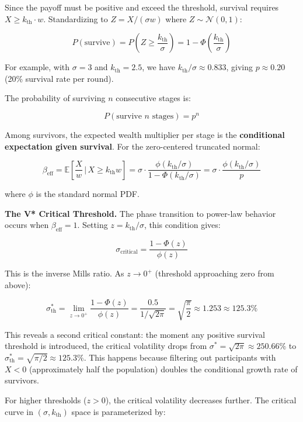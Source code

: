 \documentclass[
  11pt,
  openany]{article}
\begin{document}
Since the payoff must be positive and exceed the threshold, survival
requires \(X \geq k_{\text{th}} \cdot w\). Standardizing to
\(Z = X/(\sigma w)\) where \(Z \sim \mathcal{N}(0, 1)\):

\[P(\text{survive}) = P\left(Z \geq \frac{k_{\text{th}}}{\sigma}\right) = 1 - \Phi\left(\frac{k_{\text{th}}}{\sigma}\right)\]

For example, with \(\sigma = 3\) and \(k_{\text{th}} = 2.5\), we have
\(k_{\text{th}}/\sigma \approx 0.833\), giving \(p \approx 0.20\) (20\%
survival rate per round).

The probability of surviving \(n\) consecutive stages is:

\[P(\text{survive } n \text{ stages}) = p^n\]

Among survivors, the expected wealth multiplier per stage is the
\textbf{conditional expectation given survival}. For the zero-centered
truncated normal:

\[\beta_{\text{eff}} = \mathbb{E}\left[\frac{X}{w} \,\Big|\, X \geq k_{\text{th}} w\right] = \sigma \cdot \frac{\phi(k_{\text{th}}/\sigma)}{1 - \Phi(k_{\text{th}}/\sigma)} = \sigma \cdot \frac{\phi(k_{\text{th}}/\sigma)}{p}\]

where \(\phi\) is the standard normal PDF.

\textbf{The V* Critical Threshold.} The phase transition to power-law
behavior occurs when \(\beta_{\text{eff}} = 1\). Setting
\(z = k_{\text{th}}/\sigma\), this condition gives:

\[\sigma_{\text{critical}} = \frac{1 - \Phi(z)}{\phi(z)}\]

This is the inverse Mills ratio. As \(z \to 0^+\) (threshold approaching
zero from above):

\[\sigma_{\text{th}}^{*} = \lim_{z \to 0^+} \frac{1 - \Phi(z)}{\phi(z)} = \frac{0.5}{1/\sqrt{2\pi}} = \sqrt{\frac{\pi}{2}} \approx 1.253 \approx 125.3\%\]

This reveals a second critical constant: the moment any positive
survival threshold is introduced, the critical volatility drops from
\(\sigma^* = \sqrt{2\pi} \approx 250.66\%\) to
\(\sigma_{\text{th}}^{*} = \sqrt{\pi/2} \approx 125.3\%\). This happens
because filtering out participants with \(X < 0\) (approximately half
the population) doubles the conditional growth rate of survivors.

For higher thresholds (\(z > 0\)), the critical volatility decreases
further. The critical curve in \((\sigma, k_{\text{th}})\) space is
parameterized by:
\end{document}
